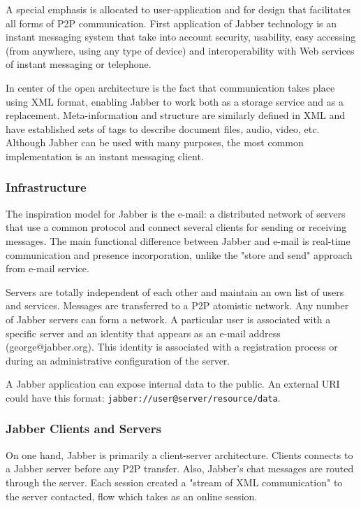 A special emphasis is allocated to user-application and for design that
facilitates all forms of P2P communication. First application of Jabber
technology is an instant messaging system that take into account security,
usability, easy accessing (from anywhere, using any type of device) and
interoperability with Web services of instant messaging or telephone.

In center of the open architecture is the fact that communication takes place
using XML format, enabling Jabber to work both as a storage service and as a
replacement. Meta-information and structure are similarly defined in XML and
have established sets of tags to describe document files, audio, video, etc.
Although Jabber can be used with many purposes, the most common implementation
is an instant messaging client.

\subsubsection{Infrastructure}

The inspiration model for Jabber is the e-mail: a distributed network of
servers that use a common protocol and connect several clients for sending or
receiving messages. The main functional difference between Jabber and e-mail
is real-time communication and presence incorporation, unlike the "store and
send" approach from e-mail service.

Servers are totally independent of each other and maintain an own list of users
and services. Messages are transferred to a P2P atomistic network. Any number
of Jabber servers can form a network. A particular user is associated with a
specific server and an identity that appears as an e-mail address
(george@jabber.org). This identity is associated with a registration process
or during an administrative configuration of the server.

A Jabber application can expose internal data to the public. An external URI
could have this format:
\texttt{jabber://user@server/resource/data}.

\subsubsection{Jabber Clients and Servers}

On one hand, Jabber is primarily a client-server architecture. Clients connects
to a Jabber server before any P2P transfer. Also, Jabber's chat messages are
routed through the server. Each session created a "stream of XML communication"
to the server contacted, flow which takes as an online session.

